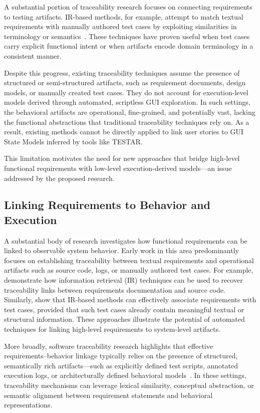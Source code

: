 \documentclass{ou-report-vaf}
\begin{document}
A substantial portion of traceability research focuses on connecting requirements to testing artifacts. IR-based methods, for example, attempt to match textual requirements with manually authored test cases by exploiting similarities in terminology or semantics~\citep{hayes2003improving,oliveto2010equivalence}. These techniques have proven useful when test cases carry explicit functional intent or when artifacts encode domain terminology in a consistent manner.

Despite this progress, existing traceability techniques assume the presence of structured or semi-structured artifacts, such as requirement documents, design models, or manually created test cases. They do not account for execution-level models derived through automated, scriptless GUI exploration. In such settings, the behavioral artifacts are operational, fine-grained, and potentially vast, lacking the functional abstractions that traditional traceability techniques rely on. As a result, existing methods cannot be directly applied to link user stories to GUI State Models inferred by tools like TESTAR.

This limitation motivates the need for new approaches that bridge high-level functional requirements with low-level execution-derived models—an issue addressed by the proposed research.

\subsection{Linking Requirements to Behavior and Execution}
\label{subsec:req-to-behavior}

A substantial body of research investigates how functional requirements can be linked to observable system behavior. Early work in this area predominantly focuses on establishing traceability between textual requirements and operational artifacts such as source code, logs, or manually authored test cases. For example, \citet{antoniol2002recovering} demonstrate how information retrieval (IR) techniques can be used to recover traceability links between requirements documentation and source code. Similarly, \citet{hayes2003improving} show that IR-based methods can effectively associate requirements with test cases, provided that such test cases already contain meaningful textual or structural information. These approaches illustrate the potential of automated techniques for linking high-level requirements to system-level artifacts.

More broadly, software traceability research highlights that effective requirements–behavior linkage typically relies on the presence of structured, semantically rich artifacts—such as explicitly defined test scripts, annotated execution logs, or architecturally defined behavioral models~\citep{cleland2014software}. In these settings, traceability mechanisms can leverage lexical similarity, conceptual abstraction, or semantic alignment between requirement statements and behavioral representations.
\end{document}
